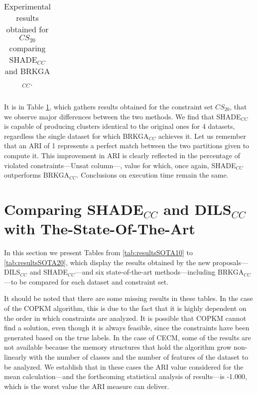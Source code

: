 \begin{table}[!h]
{\begin{tabular}{l ccc c ccc}
	\end{tabular}}
	
	\caption[Experimental results obtained for $CS_{20}$ comparing SHADE$_{CC}$ and BRKGA$_{CC}$.]{Experimental results obtained for $CS_{20}$ comparing \acs{SHADE}$_{CC}$ and \acs{BRKGA}$_{CC}$.}
	\label{tab:resultsBRKGAvsSHADE20}
\end{table}

It is in Table \ref{tab:resultsBRKGAvsSHADE20}, which gathers results obtained for the constraint set $CS_{20}$, that we observe major differences between the two methods. We find that \acs{SHADE}$_{CC}$ is capable of producing clusters identical to the original ones for 4 datasets, regardless the single dataset for which \acs{BRKGA}$_{CC}$ achieves it. Let us remember that an \acs{ARI} of 1 represents a perfect match between the two partitions given to compute it. This improvement in \acs{ARI} is clearly reflected in the percentage of violated constraints---Unsat column---, value for which, once again, \acs{SHADE}$_{CC}$ outperforms \acs{BRKGA}$_{CC}$. Conclusions on execution time remain the same.

\newpage

\section{Comparing SHADE$_{CC}$ and DILS$_{CC}$ with The-State-Of-The-Art} \label{sec:NewPropvsSOTA}

In this section we present Tables from \ref{tab:resultsSOTA10} to \ref{tab:resultsSOTA20}, which display the results obtained by the new proposals---\acs{DILS}$_{CC}$ and \acs{SHADE}$_{CC}$---and six state-of-the-art methods---including \acs{BRKGA}$_{CC}$---to be compared for each dataset and constraint set.

It should be noted that there are some missing results in these tables. In the case of the \acs{COPKM} algorithm, this is due to the fact that it is highly dependent on the order in which constraints are analyzed. It is possible that \acs{COPKM} cannot find a solution, even though it is always feasible, since the constraints have been generated based on the true labels. In the case of CECM, some of the results are not available because the memory structures that hold the algorithm grow non-linearly with the number of classes and the number of features of the dataset to be analyzed. We establish that in these cases the \acs{ARI} value considered for the mean calculation---and the forthcoming statistical analysis of results---is -1.000, which is the worst value the \acs{ARI} measure can deliver.

